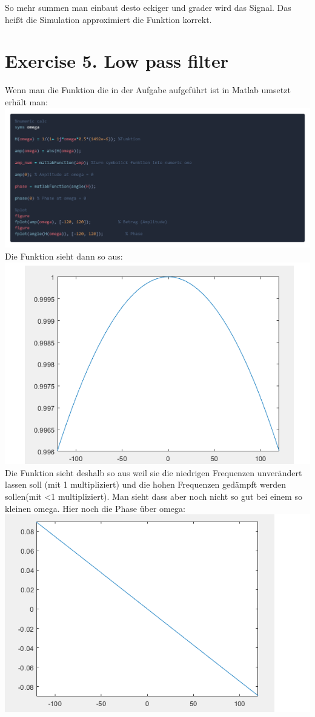 \documentclass{scrartcl}
\begin{document}
So mehr summen man einbaut desto eckiger und grader wird das Signal. Das heißt die Simulation approximiert die Funktion korrekt.\\

\section*{Exercise 5. Low pass filter}
Wenn man die Funktion die in der Aufgabe aufgeführt ist in Matlab umsetzt erhält man:\\
\includegraphics[scale=0.18]{lowpass_filter_code.png}\\
Die Funktion sieht dann so aus:\\
\includegraphics[scale=0.8]{lowpass_filter_out.png}\\
Die Funktion sieht deshalb so aus weil sie die niedrigen Frequenzen unverändert lassen soll (mit 1 multipliziert) und die hohen Frequenzen gedämpft werden sollen(mit <1 multipliziert). Man sieht dass aber noch nicht so gut bei einem so kleinen omega. Hier noch die Phase über omega:\\
\includegraphics[scale=0.8]{lowpass_filter_out2.png}

 
\end{document}
